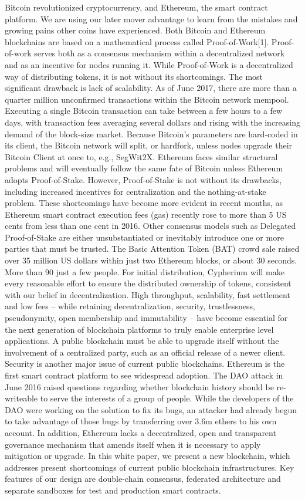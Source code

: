 Bitcoin revolutionized cryptocurrency, and Ethereum, the smart contract platform. We
are using our later mover advantage to learn from the mistakes and growing pains other
coins have experienced.
Both Bitcoin and Ethereum blockchains are based on a mathematical process called
Proof-of-Work[1]. Proof-of-work serves both as a consensus mechanism within a decentralized
network and as an incentive for nodes running it. While Proof-of-Work is a decentralized
way of distributing tokens, it is not without its shortcomings. The most significant
drawback is lack of scalability. As of June 2017, there are more than a quarter million
unconfirmed transactions within the Bitcoin network mempool. Executing a single Bitcoin
transaction can take between a few hours to a few days, with transaction fees averaging
several dollars and rising with the increasing demand of the block-size market. Because
Bitcoin’s parameters are hard-coded in its client, the Bitcoin network will split, or hardfork,
unless nodes upgrade their Bitcoin Client at once to, e.g., SegWit2X.
Ethereum faces similar structural problems and will eventually follow the same fate of
Bitcoin unless Ethereum adopts Proof-of-Stake. However, Proof-of-Stake is not without its
drawbacks, including increased incentives for centralization and the nothing-at-stake
problem. These shortcomings have become more evident in recent months, as Ethereum
smart contract execution fees (gas) recently rose to more than 5 US cents from less than one
cent in 2016. Other consensus models such as Delegated Proof-of-Stake are either
unsubstantiated or inevitably introduce one or more parties that must be trusted.
The Basic Attention Token (BAT) crowd sale raised over 35 million US dollars within
just two Ethereum blocks, or about 30 seconds. More than 90%
just a few people. For initial distribution, Cypherium will make every reasonable effort to
ensure the distributed ownership of tokens, consistent with our belief in decentralization.
High throughput, scalability, fast settlement and low fees -- while retaining
decentralization, security, trustlessness, pseudonymity, open membership and immutability
-- have become essential for the next generation of blockchain platforms to truly enable
enterprise level applications. A public blockchain must be able to upgrade itself without the
involvement of a centralized party, such as an official release of a newer client.
Security is another major issue of current public blockchains. Ethereum is the first
smart contract platform to see widespread adoption. The DAO attack in June 2016 raised
questions regarding whether blockchain history should be re-writeable to serve the
interests of a group of people. While the developers of the DAO were working on the solution
to fix its bugs, an attacker had already begun to take advantage of those bugs by
transferring over 3.6m ethers to his own account. In addition, Ethereum lacks a
decentralized, open and transparent governance mechanism that amends itself when it is
necessary to apply mitigation or upgrade.
In this white paper, we present a new blockchain, which addresses present
shortcomings of current public blockchain infrastructures. Key features of our design are
double-chain consensus, federated architecture and separate sandboxes for test and
production smart contracts.
